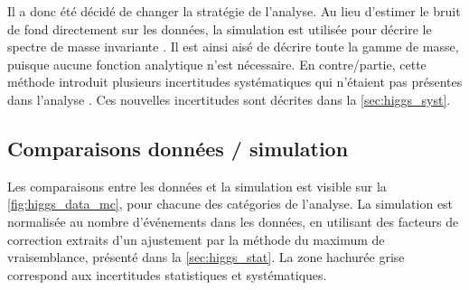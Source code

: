 Il a donc été décidé de changer la stratégie de l'analyse. Au lieu d'estimer le bruit de fond directement sur les données, la simulation est utilisée pour décrire le spectre de masse invariante \mtt. Il est ainsi aisé de décrire toute la gamme de masse, puisque aucune fonction analytique n'est nécessaire. En contre\-/partie, cette méthode introduit plusieurs incertitudes systématiques qui n'étaient pas présentes dans l'analyse \zprime. Ces nouvelles incertitudes sont décrites dans la \cref{sec:higgs_syst}.

\subsection{Comparaisons données / simulation}

Les comparaisons entre les données et la simulation est visible sur la \cref{fig:higgs_data_mc}, pour chacune des catégories de l'analyse. La simulation est normalisée au nombre d'événements dans les données, en utilisant des facteurs de correction extraits d'un ajustement par la méthode du maximum de vraisemblance, présenté dans la \cref{sec:higgs_stat}. La zone hachurée grise correspond aux incertitudes statistiques et systématiques.


